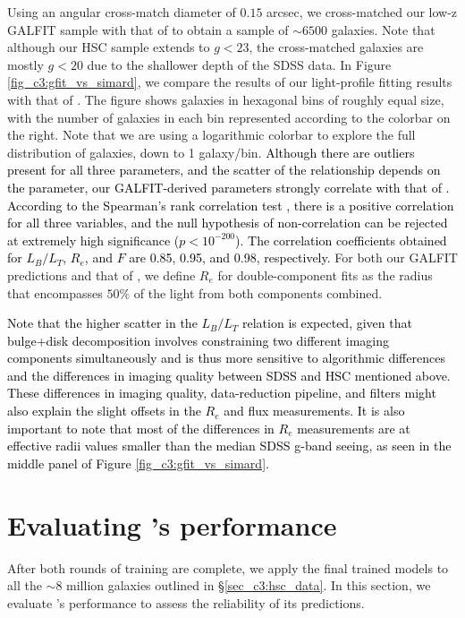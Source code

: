 Using an angular cross-match diameter of $0.15$ arcsec, we cross-matched our low-z GALFIT sample with that of \citet{simard_11} to obtain a sample of $\sim6500$ galaxies. Note that although our HSC sample extends to $g < 23$, the cross-matched galaxies are mostly $g < 20$ due to the shallower depth of the SDSS data. In Figure \ref{fig_c3:gfit_vs_simard}, we compare the results of our light-profile fitting results with that of \citet{simard_11}. The figure shows galaxies in hexagonal bins of roughly equal size, with the number of galaxies in each bin represented according to the colorbar on the right. Note that we are using a logarithmic colorbar to explore the full distribution of galaxies, down to 1 galaxy/bin. \textcolor{black}{Although there are outliers present for all three parameters, and the scatter of the relationship depends on the parameter, our GALFIT-derived parameters strongly correlate with that of \citet{simard_11}. According to the Spearman's rank correlation test \citep[see][for more details]{spearman}, there is a positive correlation for all three variables, and the null hypothesis of non-correlation can be rejected at extremely high significance ($p < 10^{-200}$). The correlation coefficients obtained for $L_B/L_T$, $R_e$, and $F$ are 0.85, 0.95, and 0.98, respectively.} For both our GALFIT predictions and that of \citet{simard_11}, we define $R_e$ for double-component fits as the radius that encompasses $50\%$ of the light from both components combined.

\textcolor{black}{Note that the higher scatter in the $L_B/L_T$ relation is expected, given that bulge+disk decomposition involves constraining two different imaging components simultaneously and is thus more sensitive to algorithmic differences and the differences in imaging quality between SDSS and HSC mentioned above. These differences in imaging quality, data-reduction pipeline, and filters \citep{hsc_filters} might also explain the slight offsets in the $R_e$ and flux measurements. It is also important to note that most of the differences in $R_e$ measurements are at effective radii values smaller than the median SDSS g-band seeing, as seen in the middle panel of Figure \ref{fig_c3:gfit_vs_simard}. } 

\section{Evaluating \gampen{}'s performance} \label{sec_c3:results}
After both rounds of training are complete, we apply the final trained \gampen{} models to all the $\sim 8$ million galaxies outlined in \S \ref{sec_c3:hsc_data}. In this section, we evaluate \gampen{}'s performance to assess the reliability of its predictions.



